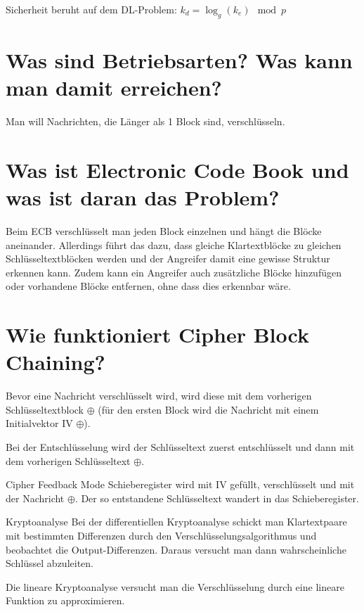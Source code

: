 \documentclass{article}
\begin{document}
	Sicherheit beruht auf dem DL-Problem: $k_d = \log_g(k_e) \mod p$
	
	\section*{Was sind Betriebsarten? Was kann man damit erreichen?}
	
	Man will Nachrichten, die Länger als 1 Block sind, verschlüsseln.
	
	\section*{Was ist Electronic Code Book und was ist daran das Problem?}
	
	Beim ECB verschlüsselt man jeden Block einzelnen und hängt die Blöcke aneinander. Allerdings führt das dazu, dass gleiche Klartextblöcke zu gleichen Schlüsseltextblöcken werden und der Angreifer damit eine gewisse Struktur erkennen kann. Zudem kann ein Angreifer auch zusätzliche Blöcke hinzufügen oder vorhandene Blöcke entfernen, ohne dass dies erkennbar wäre.
	
	\section*{Wie funktioniert Cipher Block Chaining?}
	
	Bevor eine Nachricht verschlüsselt wird, wird diese mit dem vorherigen Schlüsseltextblock $\oplus$ (für den ersten Block wird die Nachricht mit einem Initialvektor IV $\oplus$).
	
	Bei der Entschlüsselung wird der Schlüsseltext zuerst entschlüsselt und dann mit dem vorherigen Schlüsseltext $\oplus$.
	
	\begin{exkurs}{Cipher Feedback Mode}
		Schieberegister wird mit IV gefüllt, verschlüsselt und mit der Nachricht $\oplus$. Der so entstandene Schlüsseltext wandert in das Schieberegister.
	\end{exkurs}
	
	\begin{exkurs}{Kryptoanalyse}
		Bei der differentiellen Kryptoanalyse schickt man Klartextpaare mit bestimmten Differenzen durch den Verschlüsselungsalgorithmus und beobachtet die Output-Differenzen. Daraus versucht man dann wahrscheinliche Schlüssel abzuleiten.
		
		Die lineare Kryptoanalyse versucht man die Verschlüsselung durch eine lineare Funktion zu approximieren.
	\end{exkurs}
	
\end{document}
